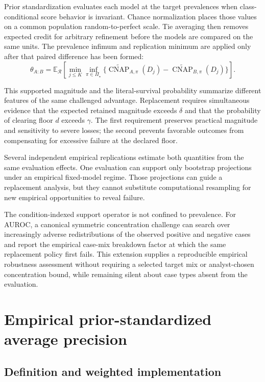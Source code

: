 \documentclass[11pt]{article}
\newcommand{\CNAP}{\operatorname{CNAP}}
\newcommand{\Regime}{\mathcal{R}}
\newcommand{\PSet}{\Pi_\star}
\newcommand{\E}{\mathbb{E}}
\newcommand{\CNAPta}{\widetilde{\CNAP}}
\theoremstyle{remark}
\begin{document}
Prior standardization evaluates each model at the target prevalences when class-conditional score behavior is invariant. Chance normalization places those values on a common population random-to-perfect scale. Tie averaging then removes expected credit for arbitrary refinement before the models are compared on the same units. The prevalence infimum and replication minimum are applied only after that paired difference has been formed:
\[
\theta_{A:B}
=
\E_{\Regime}
\left[
\min_{j\leq K}
\inf_{\pi\in\PSet}
\{\CNAPta_{A,\pi}(D_j)-\CNAPta_{B,\pi}(D_j)\}
\right].
\]

This supported magnitude and the literal-survival probability summarize different features of the same challenged advantage. Replacement requires simultaneous evidence that the expected retained magnitude exceeds $\delta$ and that the probability of clearing floor $d$ exceeds $\gamma$. The first requirement preserves practical magnitude and sensitivity to severe losses; the second prevents favorable outcomes from compensating for excessive failure at the declared floor.

Several independent empirical replications estimate both quantities from the same evaluation effects. One evaluation can support only bootstrap projections under an empirical fixed-model regime. Those projections can guide a replacement analysis, but they cannot substitute computational resampling for new empirical opportunities to reveal failure.

The condition-indexed support operator is not confined to prevalence. For AUROC, a canonical symmetric concentration challenge can search over increasingly adverse redistributions of the observed positive and negative cases and report the empirical case-mix breakdown factor at which the same replacement policy first fails. This extension supplies a reproducible empirical robustness assessment without requiring a selected target mix or analyst-chosen concentration bound, while remaining silent about case types absent from the evaluation.

\appendix

\section{Empirical prior-standardized average precision}
\label{app:ap}

\subsection{Definition and weighted implementation}
\end{document}
